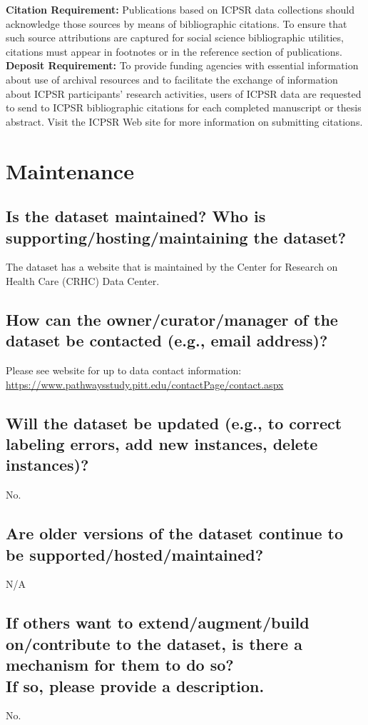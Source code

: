 \documentclass[letterpaper, 10 pt, conference]{ieeeconf}  %
\newcommand{\subtitle}[1]{{\\ \small \normalfont \color{purple} #1}}
\begin{document}
\textbf{Citation Requirement:} Publications based on ICPSR data collections should acknowledge those sources by means of bibliographic citations. To ensure that such source attributions are captured for social science bibliographic utilities, citations must appear in footnotes or in the reference section of publications. \\

\textbf{Deposit Requirement:} To provide funding agencies with essential information about use of archival resources and to facilitate the exchange of information about ICPSR participants' research activities, users of ICPSR data are requested to send to ICPSR bibliographic citations for each completed manuscript or thesis abstract. Visit the ICPSR Web site for more information on submitting citations.


\section{Maintenance}

\subsection{Is the dataset maintained? Who is supporting/hosting/maintaining the dataset?}

The dataset has a website that is maintained by the Center for Research on Health Care (CRHC) Data Center. 

\subsection{How can the owner/curator/manager of the dataset be contacted (e.g., email address)?}

Please see website for up to data contact information: \\

\href{https://www.pathwaysstudy.pitt.edu/contactPage/contact.aspx}{https://www.pathwaysstudy.pitt.edu/contactPage/contact.aspx}

\subsection{Will the dataset be updated (e.g., to correct labeling errors, add new instances, delete instances)?}

No.

\subsection{Are older versions of the dataset continue to be supported/hosted/maintained?}

N/A

\subsection{If others want to extend/augment/build on/contribute to the dataset, is there a mechanism for them to do so? \subtitle{If so, please provide a description.}}

No. 

\medskip
 
  

\end{document}
